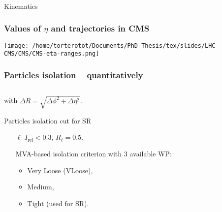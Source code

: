\begin{frame}
\begin{block}{Kinematics}
\begin{minipage}{.55\linewidth}
\begin{center}
{}
\end{center}
\end{minipage}
\end{block}

\end{frame}

\begin{frame}
\frametitle{Values of $\eta$ and trajectories in CMS}
\begin{center}
\texttt{[image: /home/torterotot/Documents/PhD-Thesis/tex/slides/LHC-CMS/CMS/CMS-eta-ranges.png]}
\end{center}
\end{frame}



\begin{frame}\addtocounter{framenumber}{-1}
\frametitle{Particles isolation -- quantitatively}
\begin{block}{}
\begin{equation*}

\end{equation*}
\begin{center}
with $\Delta R = \sqrt{\Delta\phi^2+\Delta\eta^2}$.
\end{center}
\end{block}
\pause
\begin{block}{Particles isolation cut for SR}
\begin{itemize}
\item[$\ell$] $I_\text{rel}<\num{0.3}$,
$R_\ell = \num{0.5}$.
\item[\tauh] MVA-based isolation criterion with 3 available WP:
\begin{itemize}
\item Very Loose (VLoose),
\item Medium,
\item Tight (used for SR).
\end{itemize}
\end{itemize}
\end{block}
\end{frame}


